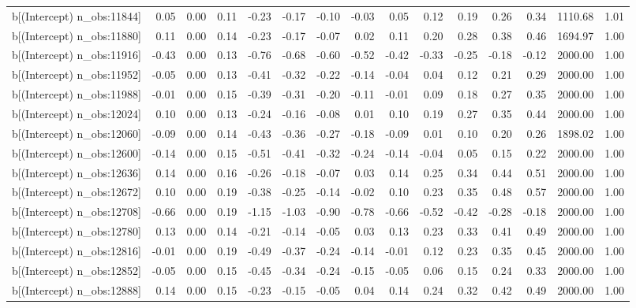 \begin{table}[ht]
\begin{tabular}{rrrrrrrrrrrrrrr}
  b[(Intercept) n\_obs:11844] & 0.05 & 0.00 & 0.11 & -0.23 & -0.17 & -0.10 & -0.03 & 0.05 & 0.12 & 0.19 & 0.26 & 0.34 & 1110.68 & 1.01 \\ 
  b[(Intercept) n\_obs:11880] & 0.11 & 0.00 & 0.14 & -0.23 & -0.17 & -0.07 & 0.02 & 0.11 & 0.20 & 0.28 & 0.38 & 0.46 & 1694.97 & 1.00 \\ 
  b[(Intercept) n\_obs:11916] & -0.43 & 0.00 & 0.13 & -0.76 & -0.68 & -0.60 & -0.52 & -0.42 & -0.33 & -0.25 & -0.18 & -0.12 & 2000.00 & 1.00 \\ 
  b[(Intercept) n\_obs:11952] & -0.05 & 0.00 & 0.13 & -0.41 & -0.32 & -0.22 & -0.14 & -0.04 & 0.04 & 0.12 & 0.21 & 0.29 & 2000.00 & 1.00 \\ 
  b[(Intercept) n\_obs:11988] & -0.01 & 0.00 & 0.15 & -0.39 & -0.31 & -0.20 & -0.11 & -0.01 & 0.09 & 0.18 & 0.27 & 0.35 & 2000.00 & 1.00 \\ 
  b[(Intercept) n\_obs:12024] & 0.10 & 0.00 & 0.13 & -0.24 & -0.16 & -0.08 & 0.01 & 0.10 & 0.19 & 0.27 & 0.35 & 0.44 & 2000.00 & 1.00 \\ 
  b[(Intercept) n\_obs:12060] & -0.09 & 0.00 & 0.14 & -0.43 & -0.36 & -0.27 & -0.18 & -0.09 & 0.01 & 0.10 & 0.20 & 0.26 & 1898.02 & 1.00 \\ 
  b[(Intercept) n\_obs:12600] & -0.14 & 0.00 & 0.15 & -0.51 & -0.41 & -0.32 & -0.24 & -0.14 & -0.04 & 0.05 & 0.15 & 0.22 & 2000.00 & 1.00 \\ 
  b[(Intercept) n\_obs:12636] & 0.14 & 0.00 & 0.16 & -0.26 & -0.18 & -0.07 & 0.03 & 0.14 & 0.25 & 0.34 & 0.44 & 0.51 & 2000.00 & 1.00 \\ 
  b[(Intercept) n\_obs:12672] & 0.10 & 0.00 & 0.19 & -0.38 & -0.25 & -0.14 & -0.02 & 0.10 & 0.23 & 0.35 & 0.48 & 0.57 & 2000.00 & 1.00 \\ 
  b[(Intercept) n\_obs:12708] & -0.66 & 0.00 & 0.19 & -1.15 & -1.03 & -0.90 & -0.78 & -0.66 & -0.52 & -0.42 & -0.28 & -0.18 & 2000.00 & 1.00 \\ 
  b[(Intercept) n\_obs:12780] & 0.13 & 0.00 & 0.14 & -0.21 & -0.14 & -0.05 & 0.03 & 0.13 & 0.23 & 0.33 & 0.41 & 0.49 & 2000.00 & 1.00 \\ 
  b[(Intercept) n\_obs:12816] & -0.01 & 0.00 & 0.19 & -0.49 & -0.37 & -0.24 & -0.14 & -0.01 & 0.12 & 0.23 & 0.35 & 0.45 & 2000.00 & 1.00 \\ 
  b[(Intercept) n\_obs:12852] & -0.05 & 0.00 & 0.15 & -0.45 & -0.34 & -0.24 & -0.15 & -0.05 & 0.06 & 0.15 & 0.24 & 0.33 & 2000.00 & 1.00 \\ 
  b[(Intercept) n\_obs:12888] & 0.14 & 0.00 & 0.15 & -0.23 & -0.15 & -0.05 & 0.04 & 0.14 & 0.24 & 0.32 & 0.42 & 0.49 & 2000.00 & 1.00 \\ 

\end{tabular}
\end{table}
